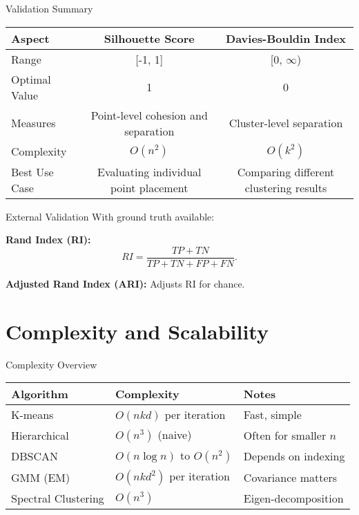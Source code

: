 \documentclass{beamer}
\begin{document}
\begin{frame}{Validation Summary}
    \begin{table}[htbp]
        \centering
        \tiny
        \begin{tabular}{|l|c|c|}
            \hline
            \textbf{Aspect} & \textbf{Silhouette Score} & \textbf{Davies-Bouldin Index} \\
            \hline
            Range & [-1, 1] & [0, $\infty$) \\
            Optimal Value & 1 & 0 \\
            Measures & Point-level cohesion and separation & Cluster-level separation \\
            Complexity & $O(n^2)$ & $O(k^2)$ \\
            Best Use Case & Evaluating individual point placement & Comparing different clustering results \\
            \hline
        \end{tabular}
    \end{table}
  
\end{frame}

\begin{frame}{External Validation}
    With ground truth available:
    
    \textbf{Rand Index (RI):}
    \[
        RI = \frac{TP + TN}{TP + TN + FP + FN}.
    \]
    
    \textbf{Adjusted Rand Index (ARI):} Adjusts RI for chance.
\end{frame}

\section{Complexity and Scalability}
\begin{frame}{Complexity Overview}
    \begin{table}[htbp]
        \centering
        \begin{tabular}{l l p{4cm}}
            \hline
            \textbf{Algorithm}  & \textbf{Complexity}        & \textbf{Notes}        \\
            \hline
            K-means             & $O(n k d)$ per iteration   & Fast, simple          \\
            Hierarchical        & $O(n^3)$ (naive)           & Often for smaller $n$ \\
            DBSCAN              & $O(n \log n)$ to $O(n^2)$  & Depends on indexing   \\
            GMM (EM)            & $O(n k d^2)$ per iteration & Covariance matters    \\
            Spectral Clustering & $O(n^3)$                   & Eigen-decomposition   \\
            \hline
        \end{tabular}
    \end{table}
\end{frame}
\end{document}
